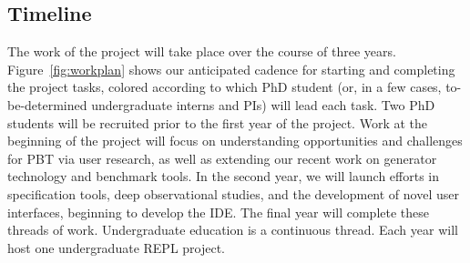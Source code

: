 
\subsection*{Timeline}

The work of the project will take place over the course of three years.
Figure~\ref{fig:workplan} shows our anticipated cadence for starting and
completing the project tasks, colored according to
which PhD student (or, in a few cases, to-be-determined undergraduate
interns and PIs) will
lead each task.
%
Two PhD students will be recruited prior to the first year of the project.  Work at the beginning
of the project will focus on understanding
opportunities and challenges for PBT via user research,
as well as extending our recent work on generator technology
and benchmark tools.
In the second year,
we will launch efforts in specification tools, deep observational
studies, and the development of novel user interfaces, beginning
to develop the \tyche{} IDE. The final year
will complete these threads of work.
Undergraduate education is a continuous thread.
Each year will host one undergraduate REPL project.




